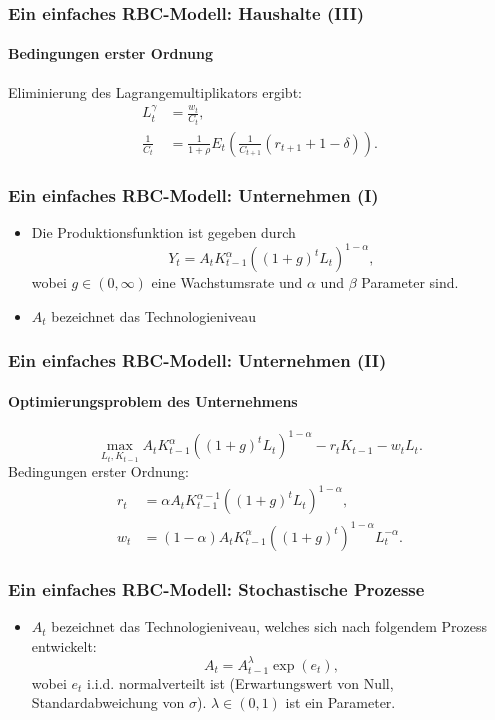 \documentclass[10pt]{beamer}  %
\begin{document}
\begin{frame}  \frametitle{Ein einfaches RBC-Modell: Haushalte (III)} \framesubtitle{Bedingungen erster Ordnung}
Eliminierung des Lagrangemultiplikators ergibt:
\begin{align*}
L_t^\gamma&=\frac{w_t}{C_t},\\
\frac{1}{C_t}&=\frac{1}{1+\rho}E_t\left(\frac{1}{C_{t+1}}(r_{t+1}+1-\delta)\right).
\end{align*}

\end{frame}



\begin{frame}
  \frametitle{Ein einfaches RBC-Modell: Unternehmen (I)}
\begin{itemize}
\item Die Produktionsfunktion ist gegeben durch
\begin{equation*}
Y_{t}=A_{t}K_{t-1}^{\alpha }\left( \left( 1+g\right) ^{t}L_{t}\right) ^{1-\alpha},
\end{equation*}%
wobei $g\in \left( 0,\infty \right) $ eine Wachstumsrate und $\alpha $ und $%
\beta $ Parameter sind.
\item $A_{t}$ bezeichnet das Technologieniveau
\end{itemize}
\end{frame}



\begin{frame}  \frametitle{Ein einfaches RBC-Modell: Unternehmen (II)}
  \framesubtitle{Optimierungsproblem des Unternehmens}
  \[
  \max_{L_t,K_{t-1}} A_tK_{t-1}^\alpha\left( \left( 1+g\right) ^{t}L_t\right)^{1-\alpha}-r_tK_{t-1}-w_tL_t.
  \]
Bedingungen erster Ordnung:
\begin{align*}
  r_t &= \alpha A_tK_{t-1}^{\alpha-1}\left( \left( 1+g\right) ^{t}L_t\right)^{1-\alpha},\\
  w_t &= (1-\alpha) A_tK_{t-1}^\alpha\left( \left( 1+g\right) ^{t}\right)^{1-\alpha}L_t^{-\alpha}.
\end{align*}
\end{frame}



\begin{frame}
  \frametitle{Ein einfaches RBC-Modell: Stochastische Prozesse}
\begin{itemize}
\item $A_{t}$ bezeichnet das Technologieniveau, welches sich nach folgendem Prozess entwickelt:
\begin{equation*}
A_{t}=A_{t-1}^{\lambda }\exp \left( e_{t}\right) ,
\end{equation*}%
wobei $e_{t}$ i.i.d. normalverteilt ist (Erwartungswert von Null, Standardabweichung von $\sigma$). $\lambda \in \left( 0,1\right) $ ist ein Parameter.
\end{itemize}
\end{frame}
\end{document}
